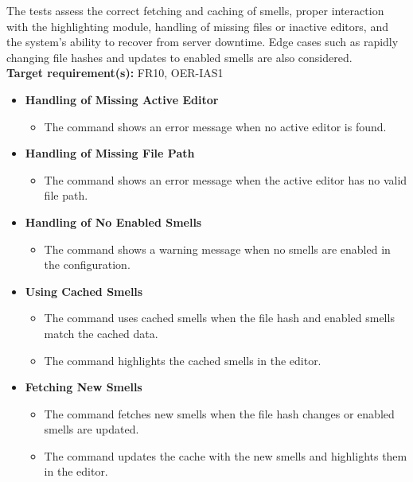 \documentclass[12pt, titlepage]{article}
\begin{document}
\begin{enumerate}[label={\bf \textcolor{Maroon}{test-SRT-\arabic*}}, wide=0pt, font=\itshape]
\noindent The tests assess the correct fetching and caching of smells, proper interaction with the highlighting module, handling of missing files or inactive editors, and the system's ability to recover from server downtime. Edge cases such as rapidly changing file hashes and updates to enabled smells are also considered.\\

\noindent\textbf{Target requirement(s):} FR10, OER-IAS1~\cite{SRS} \\

\begin{itemize}
    \item \textbf{Handling of Missing Active Editor}
    \begin{itemize}
        \item The command shows an error message when no active editor is found.
    \end{itemize}

    \item \textbf{Handling of Missing File Path}
    \begin{itemize}
        \item The command shows an error message when the active editor has no valid file path.
    \end{itemize}

    \item \textbf{Handling of No Enabled Smells}
    \begin{itemize}
        \item The command shows a warning message when no smells are enabled in the configuration.
    \end{itemize}

    \item \textbf{Using Cached Smells}
    \begin{itemize}
        \item The command uses cached smells when the file hash and enabled smells match the cached data.
        \item The command highlights the cached smells in the editor.
    \end{itemize}

    \item \textbf{Fetching New Smells}
    \begin{itemize}
        \item The command fetches new smells when the file hash changes or enabled smells are updated.
        \item The command updates the cache with the new smells and highlights them in the editor.
    \end{itemize}


\end{itemize}
\end{enumerate}
\end{document}
